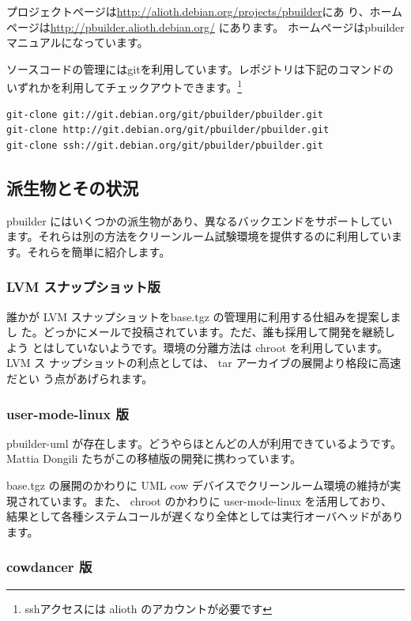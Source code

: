 \documentclass[mingoth,a4paper]{jsarticle}
\begin{document}
プロジェクトページは\url{http://alioth.debian.org/projects/pbuilder}にあ
り、ホームページは\url{http://pbuilder.alioth.debian.org/} にあります。
ホームページはpbuilderマニュアルになっています。

ソースコードの管理にはgitを利用しています。レポジトリは下記のコマンドの
いずれかを利用してチェックアウトできます。\footnote{sshアクセスには 
alioth のアカウントが必要です}

\begin{verbatim}
git-clone git://git.debian.org/git/pbuilder/pbuilder.git
git-clone http://git.debian.org/git/pbuilder/pbuilder.git
git-clone ssh://git.debian.org/git/pbuilder/pbuilder.git
\end{verbatim}

\subsection{派生物とその状況}

pbuilder にはいくつかの派生物があり、異なるバックエンドをサポートしてい
ます。それらは別の方法をクリーンルーム試験環境を提供するのに利用していま
す。それらを簡単に紹介します。

\subsubsection{LVM スナップショット版}

誰かが LVM スナップショットをbase.tgz の管理用に利用する仕組みを提案しまし
た。どっかにメールで投稿されています。ただ、誰も採用して開発を継続しよう
とはしていないようです。環境の分離方法は chroot を利用しています。LVM ス
ナップショットの利点としては、 tar アーカイブの展開より格段に高速だとい
う点があげられます。

\subsubsection{user-mode-linux 版}

pbuilder-uml が存在します。どうやらほとんどの人が利用できているようです。
Mattia Dongili たちがこの移植版の開発に携わっています。

base.tgz の展開のかわりに UML cow デバイスでクリーンルーム環境の維持が実
現されています。また、 chroot のかわりに user-mode-linux を活用しており、
結果として各種システムコールが遅くなり全体としては実行オーバヘッドがあり
ます。

\subsubsection{cowdancer 版}
\end{document}
